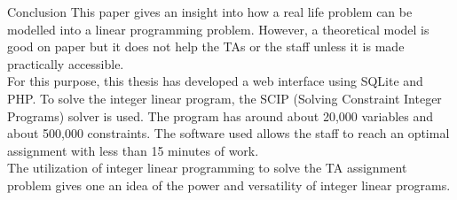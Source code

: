 \documentclass[9pt]{beamer}
\begin{document}
\begin{frame}{Conclusion}
This paper gives an insight into how a real life problem can be modelled into a linear programming problem. However, a theoretical model is good on paper but it does not help the TAs or the staff unless it is made practically accessible.  \\
\vspace{0.2cm}
For this purpose, this thesis has developed a web interface using SQLite and PHP. To solve the integer linear program, the SCIP (Solving Constraint Integer Programs) solver is used. The program has around about 20,000 variables and about 500,000 constraints. The software used allows the staff to reach an optimal assignment with less than 15 minutes of work.\\
\vspace{0.2cm}
The utilization of integer linear programming to solve the TA assignment problem gives one an idea of the power and versatility of integer linear programs. 
\end{frame}
\end{document}
